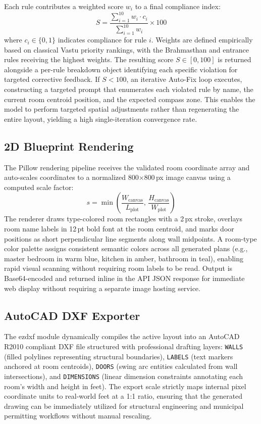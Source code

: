 \documentclass[10pt, twocolumn, letterpaper]{article}
\begin{document}
Each rule contributes a weighted score $w_i$ to a final compliance index:
\begin{equation}
  S = \frac{\sum_{i=1}^{10} w_i \cdot c_i}{\sum_{i=1}^{10} w_i} \times 100
\end{equation}
where $c_i \in \{0, 1\}$ indicates compliance for rule $i$. Weights are
defined empirically based on classical Vastu priority rankings, with the
Brahmasthan and entrance rules receiving the highest weights. The resulting score $S \in [0, 100]$ is returned alongside a per-rule breakdown object identifying each specific violation for targeted corrective feedback. If $S < 100$, an iterative Auto-Fix loop executes, constructing a targeted prompt that enumerates each violated rule by name, the current room centroid position, and the expected compass zone. This enables the model to perform targeted spatial adjustments rather than regenerating the entire layout, yielding a high single-iteration convergence rate.

\subsection{2D Blueprint Rendering}

The Pillow rendering pipeline receives the validated room coordinate array and
auto-scales coordinates to a normalized 800$\times$800\,px image canvas using
a computed scale factor:
\begin{equation}
  s = \min\!\left(\frac{W_{\text{canvas}}}{L_{\text{plot}}},\,\frac{H_{\text{canvas}}}{W_{\text{plot}}}\right)
\end{equation}
The renderer draws type-colored room rectangles with a 2\,px stroke, overlays
room name labels in 12\,pt bold font at the room centroid, and marks door
positions as short perpendicular line segments along wall midpoints. A
room-type color palette assigns consistent semantic colors across all generated
plans (e.g., master bedroom in warm blue, kitchen in amber, bathroom in teal),
enabling rapid visual scanning without requiring room labels to be read.
Output is Base64-encoded and returned inline in the API JSON response for
immediate web display without requiring a separate image hosting service.

\subsection{AutoCAD DXF Exporter}

The ezdxf module dynamically compiles the active layout into an AutoCAD R2010
compliant DXF file structured with professional drafting layers:
\texttt{WALLS} (filled polylines representing structural boundaries),
\texttt{LABELS} (text markers anchored at room centroids),
\texttt{DOORS} (swing arc entities calculated from wall intersections), and
\texttt{DIMENSIONS} (linear dimension constraints annotating each room's width
and height in feet). The export scale strictly maps internal pixel coordinate
units to real-world feet at a 1:1 ratio, ensuring that the generated drawing
can be immediately utilized for structural engineering and municipal permitting
workflows without manual rescaling.
\end{document}
